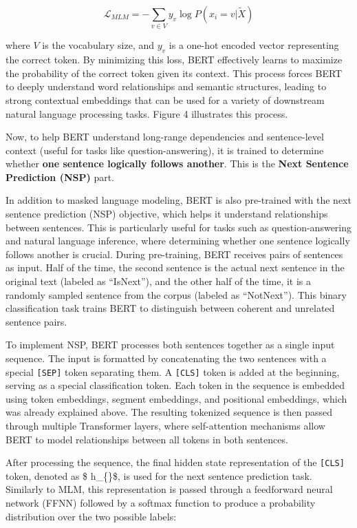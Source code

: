 \documentclass[11pt]{article}
\begin{document}
\[
\mathcal{L}_{MLM} = -\sum_{v \in V} y_v \log P(x_i = v | \tilde{X})
\]

where \(V\) is the vocabulary size, and \(y_v\) is a one-hot encoded
vector representing the correct token. By minimizing this loss, BERT
effectively learns to maximize the probability of the correct token
given its context. This process forces BERT to deeply understand word
relationships and semantic structures, leading to strong contextual
embeddings that can be used for a variety of downstream natural language
processing tasks. Figure 4 illustrates this process.

Now, to help BERT understand long-range dependencies and sentence-level
context (useful for tasks like question-answering), it is trained to
determine whether \textbf{one sentence logically follows another}. This
is the \textbf{Next Sentence Prediction (NSP)} part.

In addition to masked language modeling, BERT is also pre-trained with
the next sentence prediction (NSP) objective, which helps it understand
relationships between sentences. This is particularly useful for tasks
such as question-answering and natural language inference, where
determining whether one sentence logically follows another is crucial.
During pre-training, BERT receives pairs of sentences as input. Half of
the time, the second sentence is the actual next sentence in the
original text (labeled as ``IsNext''), and the other half of the time,
it is a randomly sampled sentence from the corpus (labeled as
``NotNext''). This binary classification task trains BERT to distinguish
between coherent and unrelated sentence pairs.

To implement NSP, BERT processes both sentences together as a single
input sequence. The input is formatted by concatenating the two
sentences with a special \texttt{{[}SEP{]}} token separating them. A
\texttt{{[}CLS{]}} token is added at the beginning, serving as a special
classification token. Each token in the sequence is embedded using token
embeddings, segment embeddings, and positional embeddings, which was
already explained above. The resulting tokenized sequence is then passed
through multiple Transformer layers, where self-attention mechanisms
allow BERT to model relationships between all tokens in both sentences.

After processing the sequence, the final hidden state representation of
the \texttt{{[}CLS{]}} token, denoted as \$ h\_\{\}\$, is used
for the next sentence prediction task. Similarly to MLM, this
representation is passed through a feedforward neural network (FFNN)
followed by a softmax function to produce a probability distribution
over the two possible labels:
\end{document}
